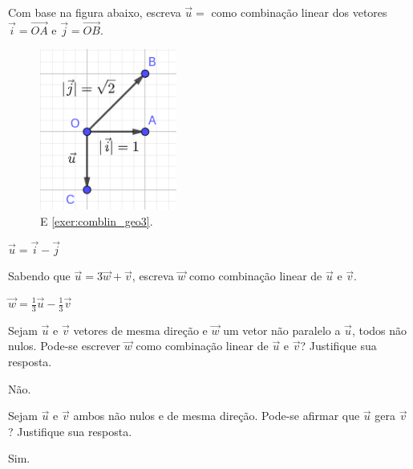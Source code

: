 \begin{exer}\label{exer:comblin_geo3}
  Com base na figura abaixo, escreva $\vec{u}=$ como combinação linear dos vetores $\vec{i}=\overrightarrow{OA}$ e $\vec{j}=\overrightarrow{OB}$.

  \begin{figure}[H]
    \centering
    \includegraphics[width=0.4\textwidth]{cap_base/dados/fig_comblin_exer_geo/fig_comblin_exer_geo3}    
    \caption{E \ref{exer:comblin_geo3}.}
    \label{fig:comblin_geo3}
  \end{figure}
\end{exer}
\begin{resp}
  $\vec{u}=\vec{i}-\vec{j}$
\end{resp}

\begin{exer}
  Sabendo que $\vec{u}=3\vec{w}+\vec{v}$, escreva $\vec{w}$ como combinação linear de $\vec{u}$ e $\vec{v}$.
\end{exer}
\begin{resp}
  $\vec{w} = \frac{1}{3}\vec{u} - \frac{1}{3}\vec{v}$
\end{resp}

\begin{exer}
  Sejam $\vec{u}$ e $\vec{v}$ vetores de mesma direção e $\vec{w}$ um vetor não paralelo a $\vec{u}$, todos não nulos. Pode-se escrever $\vec{w}$ como combinação linear de $\vec{u}$ e $\vec{v}$? Justifique sua resposta.
\end{exer}
\begin{resp}
  Não.
\end{resp}

\begin{exer}
  Sejam $\vec{u}$ e $\vec{v}$ ambos não nulos e de mesma direção. Pode-se afirmar que $\vec{u}$ gera $\vec{v}$? Justifique sua resposta.
\end{exer}
\begin{resp}
  Sim.
\end{resp}

